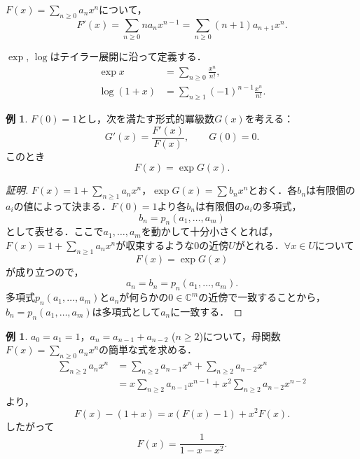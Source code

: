 \documentclass[xelatex,ja=standard,a4paper,14pt,everyparhook=compat]{bxjsarticle}
\newcommand{\bbC}{\mathbb{C}}
\theoremstyle{definition}
\newtheorem{example}[theorem]{例}
\begin{document}
$F(x) = \sum_{n \geq 0} a_n x^n$について， \begin{equation*}
    F'(x) = \sum_{n \geq 0} n a_n x^{n-1} = \sum_{n \geq 0} (n+1) a_{n+1} x^n.
\end{equation*}

$\exp$, $\log$はテイラー展開に沿って定義する． \begin{align*}
    \exp x &= \sum_{n \geq 0} \frac{x^n}{n!}, \\
    \log (1+x) &= \sum_{n \geq 1} (-1)^{n-1} \frac{x^n}{n!}.
\end{align*}

\setcounter{theorem}{10}
\begin{example}
   $F(0) = 1$とし，次を満たす形式的冪級数$G(x)$を考える： \begin{equation*}
        G'(x) = \frac{F'(x)}{F(x)}, \qquad G(0) = 0.
    \end{equation*}
    このとき \begin{equation*}
        F(x) = \exp G(x).
    \end{equation*}
\end{example}

\begin{proof}[\textup{証明}]
    $F(x) = 1 + \sum_{n \geq 1} a_n x^n$，$\exp G(x) = \sum b_n x^n$とおく．各$b_n$は有限個の$a_i$の値によって決まる．$F(0)=1$より各$b_n$は有限個の$a_i$の多項式， \begin{equation*}
        b_n = p_n (a_1, \ldots, a_m)
    \end{equation*}
    として表せる．ここで$a_1, \ldots, a_m$を動かして十分小さくとれば，$F(x) = 1 + \sum_{n \geq 1} a_n x^n$が収束するような$0$の近傍$U$がとれる．$\forall x \in U$について \begin{equation*}
        F(x) = \exp G(x)
    \end{equation*}
    が成り立つので，\begin{equation*}
        a_n = b_n = p_n(a_1, \ldots, a_m).
    \end{equation*}
    多項式$p_n(a_1, \ldots, a_m)$と$a_n$が何らかの$0 \in \bbC^m$の近傍で一致することから，$b_n = p_n(a_1, \ldots, a_m)$は多項式として$a_n$に一致する．
\end{proof}

\begin{example}
   $a_0 = a_1 = 1$，$a_n = a_{n-1} + a_{n-2}$ ($n \geq 2$)について，母関数$F(x) = \sum_{n \geq 0} a_n x^n$の簡単な式を求める． \begin{align*}
        \sum_{n \geq 2} a_n x^n &= \sum_{n \geq 2} a_{n-1} x^n + \sum_{n \geq 2} a_{n-2} x^n \\
&= x \sum_{n \geq 2} a_{n-1} x^{n-1} + x^2 \sum_{n \geq 2} a_{n-2} x^{n-2}
    \end{align*}
    より， \begin{equation*}
        F(x) - (1 + x) = x(F(x) - 1) + x^2 F(x).
    \end{equation*}
    したがって \begin{equation*}
        F(x) = \frac{1}{1-x-x^2}.
    \end{equation*}
\end{example}
\end{document}
